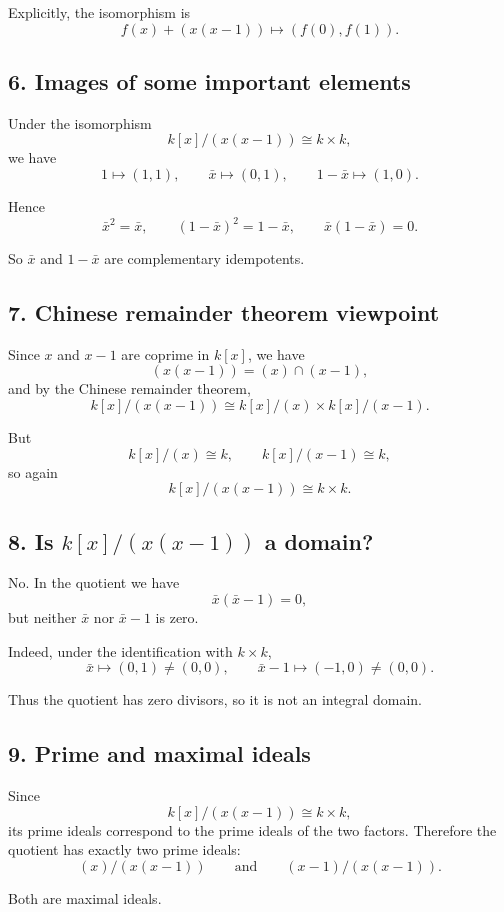 \documentclass[12pt,a4paper]{article}
\theoremstyle{notespace}
\begin{document}
Explicitly, the isomorphism is
\[
f(x)+(x(x-1))
\longmapsto
(f(0),f(1)).
\]

\subsection*{6. Images of some important elements}

Under the isomorphism
\[
k[x]/(x(x-1))\cong k\times k,
\]
we have
\[
1\longmapsto (1,1),
\qquad
\bar x\longmapsto (0,1),
\qquad
1-\bar x\longmapsto (1,0).
\]

Hence
\[
\bar x^2=\bar x,
\qquad
(1-\bar x)^2=1-\bar x,
\qquad
\bar x(1-\bar x)=0.
\]

So \(\bar x\) and \(1-\bar x\) are complementary idempotents.

\subsection*{7. Chinese remainder theorem viewpoint}

Since \(x\) and \(x-1\) are coprime in \(k[x]\), we have
\[
(x(x-1))=(x)\cap (x-1),
\]
and by the Chinese remainder theorem,
\[
k[x]/(x(x-1))
\cong
k[x]/(x)\times k[x]/(x-1).
\]

But
\[
k[x]/(x)\cong k,
\qquad
k[x]/(x-1)\cong k,
\]
so again
\[
k[x]/(x(x-1))\cong k\times k.
\]

\subsection*{8. Is \(k[x]/(x(x-1))\) a domain?}

No. In the quotient we have
\[
\bar x(\bar x-1)=0,
\]
but neither \(\bar x\) nor \(\bar x-1\) is zero.

Indeed, under the identification with \(k\times k\),
\[
\bar x\mapsto (0,1)\neq (0,0),
\qquad
\bar x-1\mapsto (-1,0)\neq (0,0).
\]

Thus the quotient has zero divisors, so it is not an integral domain.

\subsection*{9. Prime and maximal ideals}

Since
\[
k[x]/(x(x-1))\cong k\times k,
\]
its prime ideals correspond to the prime ideals of the two factors. Therefore the quotient has exactly two prime ideals:
\[
(x)/(x(x-1))
\qquad\text{and}\qquad
(x-1)/(x(x-1)).
\]

Both are maximal ideals.
\end{document}
